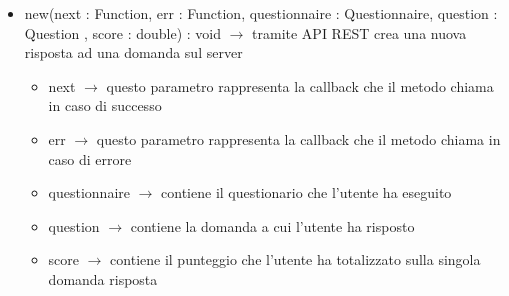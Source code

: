\begin{description}
\begin{itemize}
	\item new(next : Function, err : Function, questionnaire : Questionnaire, question : Question	, score : double) : void $\rightarrow$ tramite API REST crea una nuova risposta ad una domanda sul server
	\begin{itemize}
		\item next $\rightarrow$ questo parametro rappresenta la callback che il metodo chiama in caso di successo
		\item err $\rightarrow$ questo parametro rappresenta la callback che il metodo chiama in caso di errore
		\item questionnaire $\rightarrow$ contiene il questionario che l'utente ha eseguito
		\item question $\rightarrow$ contiene la domanda a cui l'utente ha risposto
		\item score $\rightarrow$ contiene il punteggio che l'utente ha totalizzato sulla singola domanda risposta
	\end{itemize}
	
\end{itemize}

\end{description}

\vspace{0.5cm}
